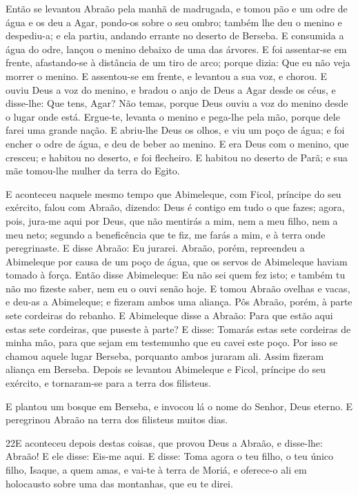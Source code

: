 Então se levantou Abraão pela manhã de madrugada, e tomou pão e
um odre de água e os deu a Agar, pondo-os sobre o seu ombro; também
lhe deu o menino e despediu-a; e ela partiu, andando errante no
deserto de Berseba. E consumida a água do odre, lançou o
menino debaixo de uma das árvores. E foi assentar-se em
frente, afastando-se à distância de um tiro de arco; porque dizia:
Que eu não veja morrer o menino. E assentou-se em frente, e levantou
a sua voz, e chorou. E ouviu Deus a voz do menino, e bradou o
anjo de Deus a Agar desde os céus, e disse-lhe: Que tens, Agar? Não
temas, porque Deus ouviu a voz do menino desde o lugar onde está.
Ergue-te, levanta o menino e pega-lhe pela mão, porque dele
farei uma grande nação. E abriu-lhe Deus os olhos, e viu um
poço de água; e foi encher o odre de água, e deu de beber ao menino.
E era Deus com o menino, que cresceu; e habitou no deserto, e
foi flecheiro. E habitou no deserto de Parã; e sua mãe
tomou-lhe mulher da terra do Egito.

E aconteceu naquele mesmo tempo que Abimeleque, com Ficol,
príncipe do seu exército, falou com Abraão, dizendo: Deus é contigo
em tudo o que fazes; agora, pois, jura-me aqui por Deus, que
não mentirás a mim, nem a meu filho, nem a meu neto; segundo a
beneficência que te fiz, me farás a mim, e à terra onde
peregrinaste. E disse Abraão: Eu jurarei. Abraão,
porém, repreendeu a Abimeleque por causa de um poço de água, que os
servos de Abimeleque haviam tomado à força. Então disse
Abimeleque: Eu não sei quem fez isto; e também tu não mo fizeste
saber, nem eu o ouvi senão hoje. E tomou Abraão ovelhas e
vacas, e deu-as a Abimeleque; e fizeram ambos uma aliança.
Pôs Abraão, porém, à parte sete cordeiras do rebanho.
E Abimeleque disse a Abraão: Para que estão aqui estas sete
cordeiras, que puseste à parte? E disse: Tomarás estas sete
cordeiras de minha mão, para que sejam em testemunho que eu cavei
este poço. Por isso se chamou aquele lugar Berseba, porquanto
ambos juraram ali. Assim fizeram aliança em Berseba. Depois
se levantou Abimeleque e Ficol, príncipe do seu exército, e
tornaram-se para a terra dos filisteus.

E plantou um bosque em Berseba, e invocou lá o nome do Senhor,
Deus eterno. E peregrinou Abraão na terra dos filisteus
muitos dias.

\smallskip

\lettrine{22} E aconteceu depois destas coisas, que provou
Deus a Abraão, e disse-lhe: Abraão! E ele disse: Eis-me aqui. E
disse: Toma agora o teu filho, o teu único filho, Isaque, a quem
amas, e vai-te à terra de Moriá, e oferece-o ali em holocausto sobre
uma das montanhas, que eu te direi.

